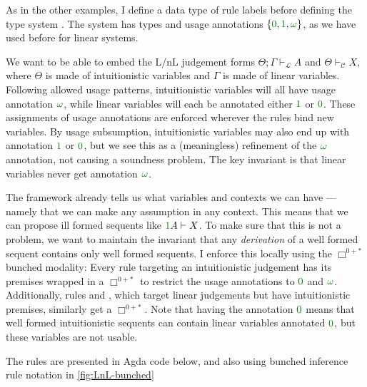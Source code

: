 
As in the other examples, I define a data type of rule labels
 before defining the type system .
The system  has types  and usage
annotations $\{\gr0, \gr1, \gr\omega\}$, as we have used before for linear
systems.

We want to be able to embed the L/nL judgement forms
$\Theta; \Gamma \vdash_{\mathcal L} A$ and $\Theta \vdash_{\mathcal C} X$, where
$\Theta$ is made of intuitionistic variables and $\Gamma$ is made of linear
variables.
Following allowed usage patterns, intuitionistic variables will all have usage
annotation $\gr\omega$, while linear variables will each be annotated
either $\gr1$ or $\gr0$.
These assignments of usage annotations are enforced wherever the rules bind new
variables.
By usage subsumption, intuitionistic variables may also end up with annotation
$\gr1$ or $\gr0$, but we see this as a (meaningless) refinement of the
$\gr\omega$ annotation, not causing a soundness problem.
The key invariant is that linear variables never get annotation $\gr\omega$.

The framework already tells us what variables and contexts we can
have --- namely that we can make any assumption in any context.
This means that we can propose ill formed sequents like
$\gr1A \vdash X$.
To make sure that this is not a problem, we want to maintain the invariant that
any \emph{derivation} of a well formed sequent contains only well formed
sequents.
I enforce this locally using the $\Box^{0{+}{*}}$ bunched modality:
Every rule targeting an intuitionistic judgement has its premises wrapped in a
$\Box^{0{+}{*}}$ to restrict the usage annotations to $\gr0$ and $\gr\omega$.
Additionally, rules  and , which target linear
judgements but have intuitionistic premises, similarly get a $\Box^{0{+}{*}}$.
Note that having the annotation $\gr0$ means that well formed intuitionistic
sequents can contain linear variables annotated $\gr0$, but these variables are
not usable.

The rules are presented in Agda code below, and also using bunched inference
rule notation in \cref{fig:LnL-bunched}


